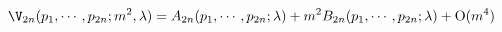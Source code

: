 \begin{equation}
\V_{2n} (p_1, \cdots, p_{2n}; m^2, \lambda) = A_{2n} (p_1, \cdots,
p_{2n}; \lambda) + m^2 B_{2n} (p_1,\cdots, p_{2n}; \lambda) + \text{O}
(m^4)
\end{equation}

